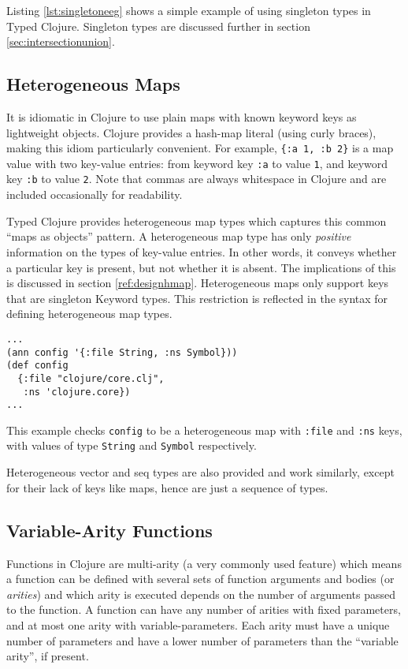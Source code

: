 Listing \ref{lst:singletoneeg} shows a simple example of using
singleton types in Typed Clojure.
Singleton types are discussed further in section \ref{sec:intersectionunion}.

\subsection{Heterogeneous Maps}

It is idiomatic in Clojure to use plain maps with known keyword keys as lightweight objects.
Clojure provides a hash-map literal (using curly braces), making this idiom particularly
convenient.
For example,
\lstinline|{:a 1, :b 2}| is a map value with two key-value entries: from keyword key \lstinline|:a|
to value \lstinline|1|, and keyword key \lstinline|:b| to value \lstinline|2|. Note that commas are always
whitespace in Clojure and are included occasionally for readability.

Typed Clojure provides heterogeneous map types which captures this common
``maps as objects'' pattern. A heterogeneous map type has only \emph{positive}
information on the types of key-value entries. In other words, it conveys
whether a particular key is present, but not whether it is absent.
The implications of this is discussed in section \ref{ref:designhmap}.
Heterogeneous maps only support keys that are singleton Keyword types. This restriction is reflected
in the syntax for defining heterogeneous map types.

\begin{lstlisting}[caption=Heterogeneous map types in Typed Clojure]
...
(ann config '{:file String, :ns Symbol}))
(def config
  {:file "clojure/core.clj",
   :ns 'clojure.core})
...
\end{lstlisting}

This example checks \lstinline|config| to be a heterogeneous map
with \lstinline|:file| and \lstinline|:ns| keys, with values of
type \lstinline|String| and \lstinline|Symbol| respectively.

Heterogeneous vector and seq types are also provided and work similarly,
except for their lack of keys like maps, hence are just a sequence of types.

\subsection{Variable-Arity Functions}

Functions in Clojure are multi-arity (a very commonly used feature) which means a function
can be defined with several sets of function arguments and bodies (or \emph{arities})
and which arity is executed depends on the number of arguments passed
to the function. A function can have any number of arities with fixed parameters, and at most one arity with
variable-parameters. Each arity must have a unique number of
parameters and have a lower number of parameters than the ``variable arity'', if present.

